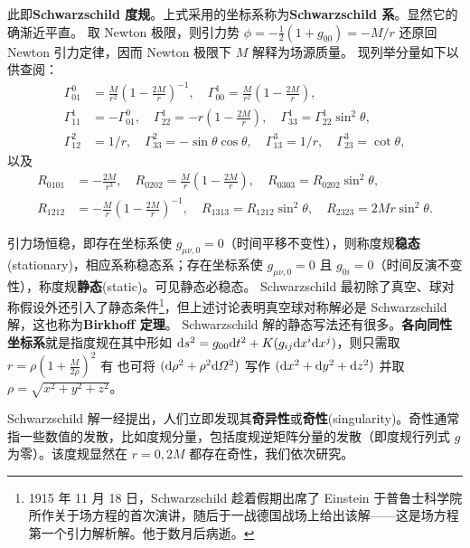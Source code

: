 此即\textbf{Schwarzschild 度规}。上式采用的坐标系称为\textbf{Schwarzschild 系}。显然它的确渐近平直。
取 Newton 极限，则引力势 $\phi=-\frac 12(1+g_{00})=-M/r$ 还原回 Newton 引力定律，因而 Newton 极限下 $M$ 解释为场源质量。
现列举分量如下以供查阅：
\begin{align*}
    \Gamma_{01}^0&=\frac{M}{r^2}\left(1-\frac{2M}{r}\right)^{-1}, \quad \Gamma_{00}^1=\frac{M}{r^2}\left(1-\frac{2M}{r}\right), \\
    \Gamma_{11}^1&=-\Gamma_{01}^0,\quad\Gamma_{22}^1=-r\left(1-\frac{2M}{r}\right),\quad\Gamma_{33}^1=\Gamma_{22}^1\sin ^2 \theta, \\
    \Gamma_{12}^2&=1 / r,\quad\Gamma_{33}^2=-\sin \theta \cos \theta,\quad\Gamma_{13}^3=1 / r,\quad\Gamma_{23}^3=\cot \theta,
\end{align*}
以及
\begin{align*}
    R_{0101}&=-\frac{2 M}{r^3}, \quad R_{0202}=\frac{M}{r}\left(1-\frac{2M}{r}\right), \quad R_{0303}=R_{0202} \sin ^2 \theta, \\
    R_{1212}&=-\frac{M}{r}\left(1-\frac{2M}{r}\right)^{-1}, \quad R_{1313}=R_{1212} \sin ^2 \theta, \quad R_{2323}=2 M r \sin ^2 \theta.
\end{align*}

引力场恒稳，即存在坐标系使 $g_{\mu\nu,0}=0$（时间平移不变性），则称度规\textbf{稳态}(stationary)，相应系称稳态系；存在坐标系使 $g_{\mu\nu,0}=0$ 且 $g_{0i}=0$（时间反演不变性），称度规\textbf{静态}(static)。可见静态必稳态。
Schwarzschild 最初除了真空、球对称假设外还引入了静态条件\footnote{1915 年 11 月 18 日，Schwarzschild 趁着假期出席了 Einstein 于普鲁士科学院所作关于场方程的首次演讲，随后于一战德国战场上给出该解——这是场方程第一个引力解析解。他于数月后病逝。}，但上述讨论表明真空球对称解必是 Schwarzschild 解，这也称为\textbf{Birkhoff 定理}。
Schwarzschild 解的静态写法还有很多。\textbf{各向同性坐标系}就是指度规在其中形如 $\dd s^2=g_{00}\dd t^2+K(g_{ij}\dd x^i\dd x^j)$，则只需取 $r=\rho(1+\frac{M}{2\rho})^2$ 有
也可将 $(\dd \rho^2+ \rho^2\dd\Omega^2)$ 写作 $(\dd x^2+\dd y^2+\dd z^2)$ 并取 $\rho=\sqrt{x^2+y^2+z^2}$。

Schwarzschild 解一经提出，人们立即发现其\textbf{奇异性}或\textbf{奇性}(singularity)。奇性通常指一些数值的发散，比如度规分量，包括度规逆矩阵分量的发散（即度规行列式 $g$ 为零）。该度规显然在 $r=0,2M$ 都存在奇性，我们依次研究。


